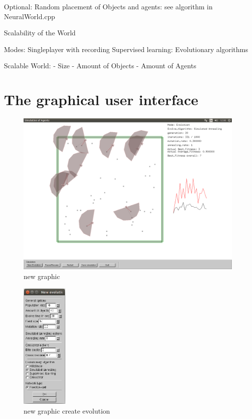 \documentclass[10pt,a4paper,DIV=11]{scrreprt}
\begin{document}
Optional: Random placement of Objects and agents: see algorithm in NeuralWorld.cpp



Scalability of the World


Modes:
Singleplayer with recording
Supervised learning:
Evolutionary algorithms

Scalable World:
- Size
- Amount of Objects
- Amount of Agents

\section{The graphical user interface}


\begin{center}
	\begin{figure}[H]
		\centering
		\includegraphics[width=1.0\textwidth,scale=1.0]{files/new_graphic.png}  
		\caption{new graphic}
		\label{fig:cosys-transform}
	\end{figure}
\end{center}


\begin{center}
	\begin{figure}[H]
		\centering
		\includegraphics[width=0.2\textwidth,scale=1.0]{files/new_graphic_new_ev.png}
		\caption{new graphic create evolution}
		\label{fig:cosys-transform}
	\end{figure}
\end{center}
\end{document}
